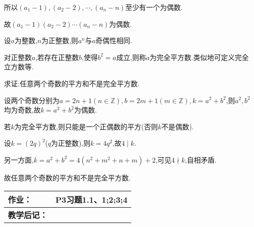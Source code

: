 所以$(a_{1}-1),(a_{2}-2),\cdots,(a_{n}-n)$至少有一个为偶数.

故$(a_{1}-1)(a_{2}-2)\cdots(a_{n}-n)$为偶数.

\property 设$a$为整数,$n$为正整数,则$a^{n}$与$a$奇偶性相同.

\example 对正整数$a$,若存在正整数$b$,使得$b^{2}=a$成立,则称$a$为完全平方数.类似地可定义完全立方数等.

求证:任意两个奇数的平方和不是完全平方数.

\proof 设两个奇数分别为$a=2n+1(n\in\mathbb{Z}),b=2m+1(m\in\mathbb{Z}),k=a^{2}+b^{2}$,则$a^{2},b^{2}$均为奇数,故$k=a^{2}+b^{2}$为偶数.

若$k$为完全平方数,则只能是一个正偶数的平方(否则$k$不是偶数).

设$k=(2q)^{2}$($q$为正整数),则$k=4q^{2}$,故$4\mid k$.

另一方面,$k=a^{2}+b^{2}=4(n^{2}+m^{2}+n+m)+2$,可见$4\nmid k$,自相矛盾.

故任意两个奇数的平方和不是完全平方数.

\begin{table}[htb]
	\centering  
	\begin{tabular}{p{22mm}|p{105.6mm}}
		\hline 
		\textbf{作业：}      & P3习题1.1、1;2;3;4  \\ \hline
		\textbf{教学后记：}  & \vspace{4ex} \\ \hline
	\end{tabular}
\end{table}
